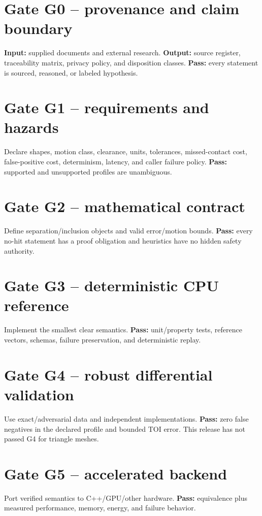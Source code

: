 \documentclass[11pt,a4paper,openany]{book}
\begin{document}
\section{Gate G0 -- provenance and claim boundary}
\textbf{Input:} supplied documents and external research. \textbf{Output:} source register, traceability matrix, privacy policy, and disposition classes. \textbf{Pass:} every statement is sourced, reasoned, or labeled hypothesis.

\section{Gate G1 -- requirements and hazards}
Declare shapes, motion class, clearance, units, tolerances, missed-contact cost, false-positive cost, determinism, latency, and caller failure policy. \textbf{Pass:} supported and unsupported profiles are unambiguous.

\section{Gate G2 -- mathematical contract}
Define separation/inclusion objects and valid error/motion bounds. \textbf{Pass:} every no-hit statement has a proof obligation and heuristics have no hidden safety authority.

\section{Gate G3 -- deterministic CPU reference}
Implement the smallest clear semantics. \textbf{Pass:} unit/property tests, reference vectors, schemas, failure preservation, and deterministic replay.

\section{Gate G4 -- robust differential validation}
Use exact/adversarial data and independent implementations. \textbf{Pass:} zero false negatives in the declared profile and bounded TOI error. This release has not passed G4 for triangle meshes.

\section{Gate G5 -- accelerated backend}
Port verified semantics to C++/GPU/other hardware. \textbf{Pass:} equivalence plus measured performance, memory, energy, and failure behavior.
\end{document}
